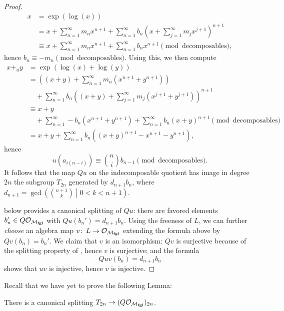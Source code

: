 \begin{proof}
\begin{align*}
x & = \exp(\log(x)) \\
& = x + \sum_{n=1}^\infty m_n x^{n+1} + \sum_{n=1}^\infty b_n \left( x + \sum_{j=1}^\infty m_j x^{j+1} \right)^{n+1} \\
& \equiv x + \sum_{n=1}^\infty m_n x^{n+1} + \sum_{n=1}^\infty b_n x^{n+1} \pmod{\text{decomposables}},
\end{align*}
hence \(b_n \equiv -m_n \pmod{\text{decomposables}}\).  Using this, we then compute
\begin{align*}
x +_u y & = \exp(\log(x) + \log(y)) \\
& = \left( (x + y) + \sum_{n=1}^\infty m_n (x^{n+1} + y^{n+1}) \right) \\
& \quad + \sum_{n=1}^\infty b_n \left( (x + y) + \sum_{j=1}^\infty m_j (x^{j+1} + y^{j+1}) \right)^{n+1} \\
& \equiv x + y \\
& \quad + \sum_{n=1}^\infty -b_n (x^{n+1} + y^{n+1}) + \sum_{n=1}^\infty b_n (x+y)^{n+1} \pmod{\text{decomposables}} \\
& = x + y + \sum_{n=1}^\infty b_n ((x+y)^{n+1} - x^{n+1} - y^{n+1}),
\end{align*}
hence \[u(a_{i(n-i)}) \equiv \binom{n}{i} b_{n-1} \pmod{\text{decomposables}}.\]  It follows that the map \(Qu\) on the indecomposable quotient has image in degree \(2n\) the subgroup \(T_{2n}\) generated by \(d_{n+1} b_n\), where \(d_{n+1} = \gcd\left( \binom{n+1}{k} \middle| 0 < k < n + 1 \right)\).

 below provides a canonical splitting of \(Qu\): there are favored elements \(b_n' \in Q\mathcal{O}_{\mathcal{M}_{\mathbf{fgl}}}\) with \(Qu(b_n') = d_{n+1} b_n\).  Using the freeness of \(L\), we can further \emph{choose} an algebra map \(v\colon\thinspace L \to \mathcal{O}_{\mathcal{M}_{\mathbf{fgl}}}\) extending the formula above by \(Qv(b_n) = b_n'\).  We claim that \(v\) is an isomorphism: \(Qv\) is surjective because of the splitting property of , hence \(v\) is surjective; and the formula \[Quv(b_n) = d_{n+1} b_n\] shows that \(uv\) is injective, hence \(v\) is injective.
\end{proof}

Recall that we have yet to prove the following Lemma:

\begin{lemma}\label{LazardSplittingLemma}
There is a canonical splitting \(T_{2n} \to (Q \mathcal O_{\mathcal{M}_{\mathbf{fgl}}})_{2n}\).
\end{lemma}

